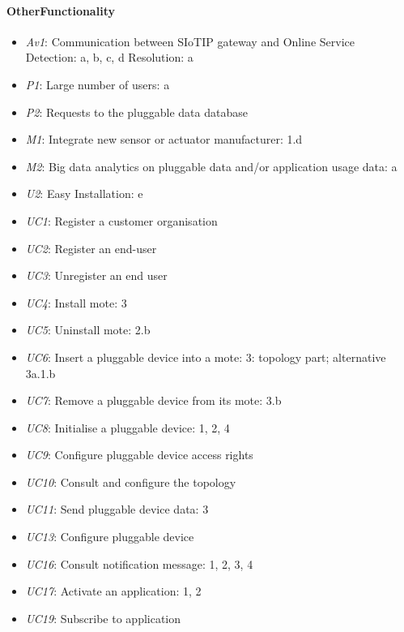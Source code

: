     \paragraph{OtherFunctionality}
        \begin{itemize}
            \item \emph{Av1}: Communication between SIoTIP gateway and Online Service \\
                               Detection: a, b, c, d
                               Resolution: a
           	\item \emph{P1}: Large number of users: a
            \item \emph{P2}: Requests to the pluggable data database
            \item \emph{M1}: Integrate new sensor or actuator manufacturer: 1.d
            \item \emph{M2}: Big data analytics on pluggable data and/or application usage data: a
            \item \emph{U2}: Easy Installation: e
            \item \emph{UC1}: Register a customer organisation
            \item \emph{UC2}: Register an end-user
            \item \emph{UC3}: Unregister an end user
            \item \emph{UC4}: Install mote: 3
            \item \emph{UC5}: Uninstall mote: 2.b
            \item \emph{UC6}: Insert a pluggable device into a mote: 3: topology part; alternative 3a.1.b
            \item \emph{UC7}: Remove a pluggable device from its mote: 3.b
            \item \emph{UC8}: Initialise a pluggable device: 1, 2, 4
            \item \emph{UC9}: Configure pluggable device access rights
            \item \emph{UC10}: Consult and configure the topology
            \item \emph{UC11}: Send pluggable device data: 3
            \item \emph{UC13}: Configure pluggable device
            \item \emph{UC16}: Consult notification message: 1, 2, 3, 4
            \item \emph{UC17}: Activate an application: 1, 2
            \item \emph{UC19}: Subscribe to application

\end{itemize}
